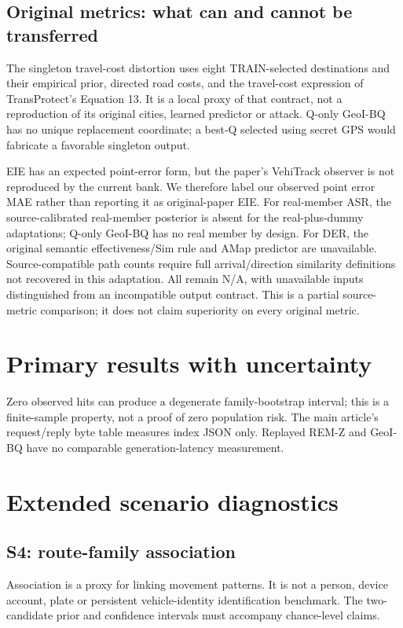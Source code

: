 \subsection{Original metrics: what can and cannot be transferred}

The singleton travel-cost distortion uses eight TRAIN-selected destinations
and their empirical prior, directed road costs, and the travel-cost expression
of TransProtect's Equation 13. It is a local proxy of that contract, not a
reproduction of its original cities, learned predictor or attack.
Q-only GeoI-BQ has no unique replacement coordinate; a best-Q selected using
secret GPS would fabricate a favorable singleton output.

EIE has an expected point-error form, but the paper's VehiTrack observer
is not reproduced by the current bank. We therefore label our observed point
error MAE rather than reporting it as original-paper EIE.
For real-member ASR, the source-calibrated real-member posterior is absent
for the real-plus-dummy adaptations; Q-only GeoI-BQ has no real member by design.
For DER, the original semantic effectiveness/Sim rule and AMap predictor
are unavailable. Source-compatible path counts require full arrival/direction
similarity definitions not recovered in this adaptation. All remain N/A,
with unavailable inputs distinguished from an incompatible output contract.
This is a partial source-metric comparison; it does not claim superiority
on every original metric.

\section{Primary results with uncertainty}






Zero observed hits can produce a degenerate family-bootstrap interval;
this is a finite-sample property, not a proof of zero population risk.
The main article's request/reply byte table measures index JSON only.
Replayed REM-Z and GeoI-BQ have no comparable generation-latency measurement.

\section{Extended scenario diagnostics}
\subsection{S4: route-family association}

Association is a proxy for linking movement patterns. It is not a person,
device account, plate or persistent vehicle-identity identification benchmark.
The two-candidate prior and confidence intervals must accompany chance-level claims.

